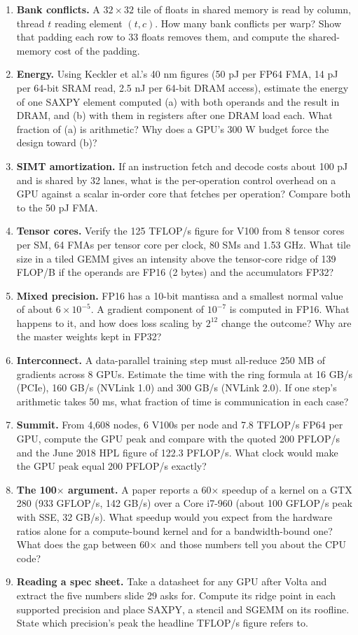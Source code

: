 \documentclass[11pt,letterpaper]{article}
\begin{document}
\begin{enumerate}[leftmargin=1.6em,itemsep=6pt]
\item \textbf{Bank conflicts.} A $32\times 32$ tile of floats in shared memory is read by column, thread $t$ reading element $(t, c)$. How many bank conflicts per warp? Show that padding each row to 33 floats removes them, and compute the shared-memory cost of the padding.
\item \textbf{Energy.} Using Keckler et al.'s 40 nm figures (50 pJ per FP64 FMA, 14 pJ per 64-bit SRAM read, 2.5 nJ per 64-bit DRAM access), estimate the energy of one SAXPY element computed (a) with both operands and the result in DRAM, and (b) with them in registers after one DRAM load each. What fraction of (a) is arithmetic? Why does a GPU's 300 W budget force the design toward (b)?
\item \textbf{SIMT amortization.} If an instruction fetch and decode costs about 100 pJ and is shared by 32 lanes, what is the per-operation control overhead on a GPU against a scalar in-order core that fetches per operation? Compare both to the 50 pJ FMA.
\item \textbf{Tensor cores.} Verify the 125 TFLOP/s figure for V100 from 8 tensor cores per SM, 64 FMAs per tensor core per clock, 80 SMs and 1.53 GHz. What tile size in a tiled GEMM gives an intensity above the tensor-core ridge of 139 FLOP/B if the operands are FP16 (2 bytes) and the accumulators FP32?
\item \textbf{Mixed precision.} FP16 has a 10-bit mantissa and a smallest normal value of about $6\times 10^{-5}$. A gradient component of $10^{-7}$ is computed in FP16. What happens to it, and how does loss scaling by $2^{12}$ change the outcome? Why are the master weights kept in FP32?
\item \textbf{Interconnect.} A data-parallel training step must all-reduce 250 MB of gradients across 8 GPUs. Estimate the time with the ring formula at 16 GB/s (PCIe), 160 GB/s (NVLink 1.0) and 300 GB/s (NVLink 2.0). If one step's arithmetic takes 50 ms, what fraction of time is communication in each case?
\item \textbf{Summit.} From 4{,}608 nodes, 6 V100s per node and 7.8 TFLOP/s FP64 per GPU, compute the GPU peak and compare with the quoted 200 PFLOP/s and the June 2018 HPL figure of 122.3 PFLOP/s. What clock would make the GPU peak equal 200 PFLOP/s exactly?
\item \textbf{The 100$\times$ argument.} A paper reports a 60$\times$ speedup of a kernel on a GTX 280 (933 GFLOP/s, 142 GB/s) over a Core i7-960 (about 100 GFLOP/s peak with SSE, 32 GB/s). What speedup would you expect from the hardware ratios alone for a compute-bound kernel and for a bandwidth-bound one? What does the gap between 60$\times$ and those numbers tell you about the CPU code?
\item \textbf{Reading a spec sheet.} Take a datasheet for any GPU after Volta and extract the five numbers slide 29 asks for. Compute its ridge point in each supported precision and place SAXPY, a stencil and SGEMM on its roofline. State which precision's peak the headline TFLOP/s figure refers to.
\end{enumerate}
\clearpage
\end{document}
